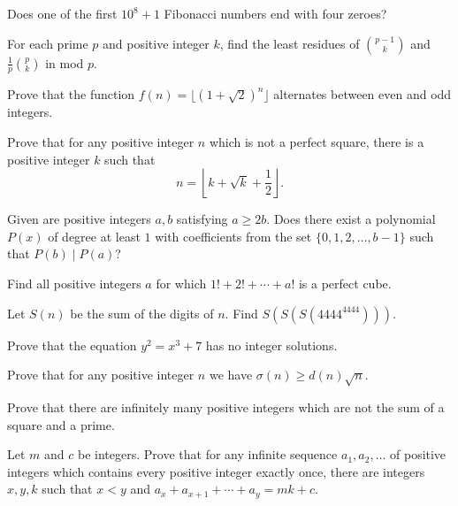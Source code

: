 \begin{problem}{\label{p:i:n:pr:14}}
    Does one of the first $10^8+1$ Fibonacci numbers end with four zeroes?
\end{problem}
\begin{problem}{\label{p:i:n:pr:14b}}
    For each prime $p$ and positive integer $k$, find the least residues of 
    \(\binom {p-1}k\) and \(\frac1p\binom pk\) in mod $p$.
\end{problem}
\begin{problem}{\label{p:i:n:pr:15}}
  Prove that the function $f(n)=\lfloor(1+\sqrt 2)^n\rfloor$ alternates
    between even and odd integers.
\end{problem}
\begin{problem}{\label{p:i:n:pr:16}}
  Prove that for any positive integer $n$ which is not a perfect square,
    there is a positive integer $k$ such that
    \[n=\left\lfloor k+\sqrt k+\frac12\right\rfloor.\]
\end{problem}
\begin{problem}{\label{p:i:n:pr:17}}
   Given are positive integers $a, b$ satisfying $a \geq 2b$. Does there
    exist a polynomial $P(x)$ of degree at least $1$ with coefficients from the
    set $\{0, 1, 2, \ldots, b-1 \}$ such that $P(b) \mid P(a)$?
\end{problem}
\begin{problem}{\label{p:i:n:pr:18}}
  Find all positive integers $a$ for which $1!+2!+\cdots+a!$ is a perfect
    cube.
\end{problem}
\begin{problem}{\label{p:i:n:pr:19}}
  Let $S(n)$ be the sum of the digits of $n$. Find $S(S(S(4444^{4444})))$.
\end{problem}
\begin{problem}{\label{p:i:n:pr:20}}
  Prove that the equation $y^2=x^3+7$ has no integer solutions.
\end{problem}
\begin{problem}{\label{p:i:n:pr:21}}
  Prove that for any positive integer $n$ we have $\sigma(n)\ge d(n)\sqrt n$.
\end{problem}
\begin{problem}{\label{p:i:n:pr:22}}
  Prove that there are infinitely many positive integers which are not the
    sum of a square and a prime.
\end{problem}
\begin{problem}{\label{p:i:n:pr:23}}
  Let $m$ and $c$ be integers.
    Prove that for any infinite sequence $a_1,a_2,\ldots$ of positive integers which
    contains every positive integer exactly once, there
    are integers $x,y,k$ such that $x<y$ and $a_x+a_{x+1}+\cdots+a_y=mk+c$.
\end{problem}
